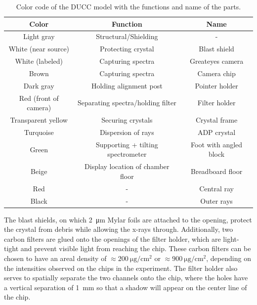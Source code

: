 \begin{table}[H]
	\centering
	\caption{Color code of the DUCC model with the functions and name 
		of 
		the parts.}
	\vspace{0.05cm}
	\renewcommand{\arraystretch}{1.5}
	\centering
	\begin{tabular}{|c|c|c|} 
		\hline
		Color & Function & Name \\ [0.5ex]
		\hline\hline
		Light gray & Structural/Shielding & - \\ 
		[0.5ex]
		\hline
		White (near source) & Protecting crystal & Blast shield \\ 
		[0.5ex]
		\hline
		White (labeled) & Capturing spectra & Greateyes camera\\ 
		[0.5ex]
		\hline
		Brown & Capturing spectra & Camera chip \\ 
		[0.5ex]
		\hline
		Dark gray & Holding alignment post & Pointer holder \\ 
		[0.5ex]
		\hline
		Red (front of camera) & Separating spectra/holding filter & 
		Filter holder \\ [0.5ex]
		\hline
		Transparent yellow & Securing crystals & Crystal frame \\ 
		[0.5ex]
		\hline
		Turquoise & Dispersion of rays & ADP crystal \\ [0.5ex]
		\hline
		Green & Supporting + tilting spectrometer & Foot with angled 
		block \\ 
		[0.5ex]
		\hline
		Beige & Display location of chamber floor & Breadboard floor \\ 
		[0.5ex]
		\hline
		Red & - & Central ray \\ 
		[0.5ex]
		\hline
		Black & - & Outer rays \\ [0.5ex]
		\hline
	\end{tabular}
	\label{Table: DUCC colors}
\end{table}

The blast shields, on which \SI{2}{\micro\meter} Mylar foils are 
attached to the opening, protect the crystal from debris while 
allowing 
the x-rays through. Additionally, two carbon filters are glued 
onto the 
openings of the filter holder, which are light-tight and prevent 
visible light from reaching the chip. These carbon 
filters can be chosen to have an areal density of 
$\approx\SI{200}{\micro\gram\per\cm\squared}$ or 
$\approx\SI{900}{\micro\gram\per\cm\squared}$, depending on the 
intensities observed on the chips in the experiment. The filter 
holder 
also 
serves to spatially separate the two channels 
onto the chip, where the holes have a vertical separation of 
\SI{1}{\milli\meter} so that a shadow will appear on the center 
line of 
the chip.

